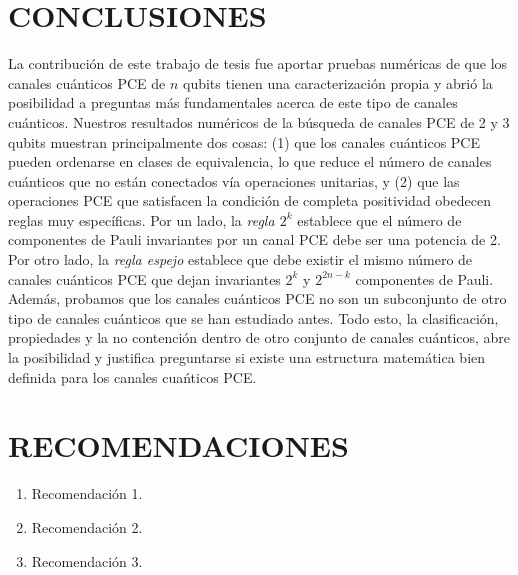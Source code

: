 

\chapter{CONCLUSIONES}
La contribución de este trabajo de tesis fue aportar pruebas numéricas
de que los canales cuánticos PCE de $n$ qubits tienen una caracterización propia 
y abrió la posibilidad a preguntas más fundamentales acerca de este 
tipo de canales cuánticos.
Nuestros resultados numéricos de la búsqueda de canales PCE de 2 y 3 qubits 
muestran principalmente dos cosas: (1) que los canales cuánticos PCE pueden 
ordenarse en clases de equivalencia, lo que reduce el número de canales cuánticos
que no están conectados vía operaciones unitarias, y (2) que las operaciones
PCE que satisfacen la condición de completa positividad obedecen reglas muy
específicas. 
Por un lado, 
la \textit{regla $2^k$} establece que el número de 
componentes de Pauli invariantes por un canal PCE debe ser una potencia de 2. 
Por otro lado, la \textit{regla espejo} establece que debe existir el mismo número de 
canales cuánticos PCE que dejan invariantes $2^k$ y $2^{2n-k}$ componentes 
de Pauli. Además, probamos que los canales cuánticos PCE no son un subconjunto
de otro tipo de canales cuánticos que se han estudiado antes. Todo esto, la clasificación,
propiedades y la no contención dentro de otro conjunto de canales cuánticos, 
abre la posibilidad y justifica preguntarse si existe una estructura matemática bien 
definida para los canales cuańticos PCE.

\chapter{RECOMENDACIONES}
\begin{enumerate}
	\item Recomendación 1.
	\item Recomendación 2.
	\item Recomendación 3.
\end{enumerate}
